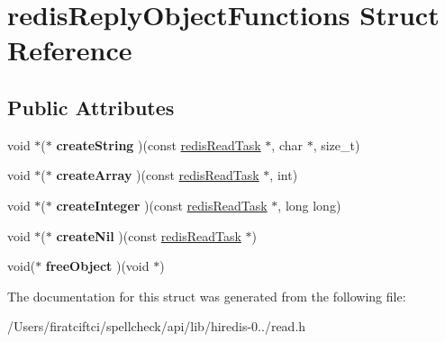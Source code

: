 \hypertarget{structredis_reply_object_functions}{}\section{redis\+Reply\+Object\+Functions Struct Reference}
\label{structredis_reply_object_functions}
\subsection*{Public Attributes}
\begin{DoxyCompactItemize}
\item 
\mbox{\label{structredis_reply_object_functions_aaee312b4a7cb8cffc0c7a588dd3066ec}} 
void $\ast$($\ast$ {\bfseries create\+String} )(const \mbox{\hyperlink{structredis_read_task}{redis\+Read\+Task}} $\ast$, char $\ast$, size\+\_\+t)
\item 
\mbox{\label{structredis_reply_object_functions_aeb36b84075f737cce48f6da24dc863fa}} 
void $\ast$($\ast$ {\bfseries create\+Array} )(const \mbox{\hyperlink{structredis_read_task}{redis\+Read\+Task}} $\ast$, int)
\item 
\mbox{\label{structredis_reply_object_functions_abd65f8490555ca7b36e8b3e5174e06cf}} 
void $\ast$($\ast$ {\bfseries create\+Integer} )(const \mbox{\hyperlink{structredis_read_task}{redis\+Read\+Task}} $\ast$, long long)
\item 
\mbox{\label{structredis_reply_object_functions_a7dd9fb4c1e6df6c9b552513c768d74dd}} 
void $\ast$($\ast$ {\bfseries create\+Nil} )(const \mbox{\hyperlink{structredis_read_task}{redis\+Read\+Task}} $\ast$)
\item 
\mbox{\label{structredis_reply_object_functions_a3fbe4633d7a5447a8809f538b6ffd569}} 
void($\ast$ {\bfseries free\+Object} )(void $\ast$)
\end{DoxyCompactItemize}


The documentation for this struct was generated from the following file\+:\begin{DoxyCompactItemize}
\item 
/\+Users/firatciftci/spellcheck/api/lib/hiredis-\/0../read.\+h\end{DoxyCompactItemize}
